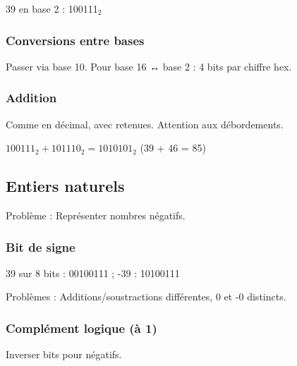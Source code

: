 \documentclass[12pt,a4paper]{article}
\begin{document}
\begin{exemple}
39 en base 2 : 100111$_2$
\end{exemple}

\subsubsection{Conversions entre bases}
\begin{methode}
Passer via base 10. Pour base 16 ↔ base 2 : 4 bits par chiffre hex.
\end{methode}

\subsubsection{Addition}
\begin{methode}
Comme en décimal, avec retenues. Attention aux débordements.
\end{methode}

\begin{exemple}
$100111_2 + 101110_2 = 1010101_2$ (39 + 46 = 85)
\end{exemple}

\newpage
\subsection{Entiers naturels}

\begin{remarque}
Problème : Représenter nombres négatifs.
\end{remarque}

\subsubsection{Bit de signe}
\begin{exemple}
39 sur 8 bits : 00100111 ; -39 : 10100111
\end{exemple}

\begin{remarque}
Problèmes : Additions/soustractions différentes, 0 et -0 distincts.
\end{remarque}

\subsubsection{Complément logique (à 1)}
\begin{methode}
Inverser bits pour négatifs.
\end{methode}
\end{document}
